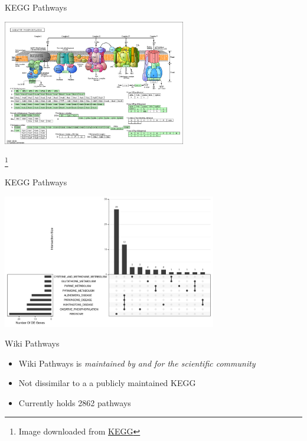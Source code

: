 \documentclass[aspectratio=169,11pt]{beamer}
\newcommand\blfootnote[1]{%
  \begingroup
  \renewcommand\thefootnote{}\footnote{#1}%
  \addtocounter{footnote}{-1}%
  \endgroup
}
\begin{document}
\begin{frame}{KEGG Pathways}

	\begin{center}
	\includegraphics[width=0.6\textwidth]{figures/hsa00190.png} 
	\end{center}
	
	\blfootnote{Image downloaded from \href{https://www.genome.jp/kegg-bin/show_pathway?org_name=hsa&mapno=00190&scale=&orgs=&auto_image=&nocolor=&show_description=show}{KEGG}}

\end{frame}


\begin{frame}{KEGG Pathways}

	\begin{center}
		\includegraphics[width=0.7\textwidth]{figures/kgFryUpset-1.png} 
	\end{center}

\end{frame}


\begin{frame}{Wiki Pathways}

	\begin{itemize}
		\item Wiki Pathways is \textit{maintained by and for the scientific community}
		\item Not dissimilar to a a publicly maintained KEGG
		\item Currently holds 2862 pathways
	\end{itemize}

\end{frame}
\end{document}
